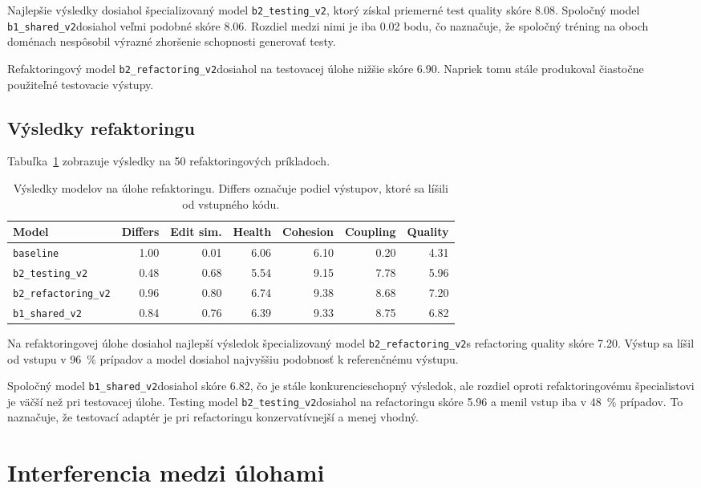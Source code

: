 \documentclass[11pt,a4paper]{article}
\newcommand{\modeltest}{\texttt{b2\_testing\_v2}}
\newcommand{\modelref}{\texttt{b2\_refactoring\_v2}}
\newcommand{\modelshared}{\texttt{b1\_shared\_v2}}
\begin{document}
Najlepšie výsledky dosiahol špecializovaný model \modeltest, ktorý získal priemerné test quality skóre 8.08. Spoločný model \modelshared dosiahol veľmi podobné skóre 8.06. Rozdiel medzi nimi je iba 0.02 bodu, čo naznačuje, že spoločný tréning na oboch doménach nespôsobil výrazné zhoršenie schopnosti generovať testy.

Refaktoringový model \modelref dosiahol na testovacej úlohe nižšie skóre 6.90. Napriek tomu stále produkoval čiastočne použiteľné testovacie výstupy.

\subsection{Výsledky refaktoringu}

Tabuľka~\ref{tab:refactoring-results} zobrazuje výsledky na 50 refaktoringových príkladoch.

\begin{table}[h]
\centering
\small
\begin{tabular}{lrrrrrr}
\toprule
Model & Differs & Edit sim. & Health & Cohesion & Coupling & Quality \\
\midrule
\texttt{baseline} & 1.00 & 0.01 & 6.06 & 6.10 & 0.20 & 4.31 \\
\modeltest & 0.48 & 0.68 & 5.54 & 9.15 & 7.78 & 5.96 \\
\modelref & 0.96 & 0.80 & 6.74 & 9.38 & 8.68 & 7.20 \\
\modelshared & 0.84 & 0.76 & 6.39 & 9.33 & 8.75 & 6.82 \\
\bottomrule
\end{tabular}
\caption{Výsledky modelov na úlohe refaktoringu. Differs označuje podiel výstupov, ktoré sa líšili od vstupného kódu.}
\label{tab:refactoring-results}
\end{table}

Na refaktoringovej úlohe dosiahol najlepší výsledok špecializovaný model \modelref s refactoring quality skóre 7.20. Výstup sa líšil od vstupu v 96~\% prípadov a model dosiahol najvyššiu podobnosť k referenčnému výstupu.

Spoločný model \modelshared dosiahol skóre 6.82, čo je stále konkurencieschopný výsledok, ale rozdiel oproti refaktoringovému špecialistovi je väčší než pri testovacej úlohe. Testing model \modeltest dosiahol na refactoringu skóre 5.96 a menil vstup iba v 48~\% prípadov. To naznačuje, že testovací adaptér je pri refactoringu konzervatívnejší a menej vhodný.

\section{Interferencia medzi úlohami}
\end{document}
